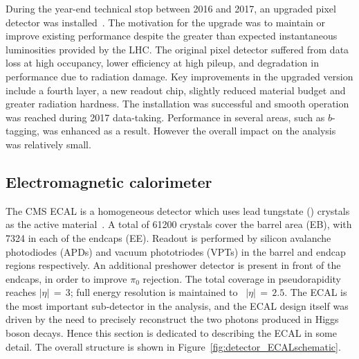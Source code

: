 During the year-end technical stop between 2016 and 2017, an upgraded pixel detector was installed~\cite{PixelUpgrade}.
The motivation for the upgrade was to maintain or improve existing performance despite the greater than expected instantaneous luminosities provided by the LHC.
The original pixel detector suffered from data loss at high occupancy, lower efficiency at high pileup, and degradation in performance due to radiation damage.
Key improvements in the upgraded version include a fourth layer, a new readout chip, slightly reduced material budget and greater radiation hardness.
The installation was successful and smooth operation was reached during 2017 data-taking.
Performance in several areas, such as $b$-tagging, was enhanced as a result.
However the overall impact on the \Hgg analysis was relatively small.

\subsection{Electromagnetic calorimeter}
\label{sec:detector_ECAL}

The CMS ECAL is a homogeneous detector which uses lead tungstate (\pbw) crystals as the active material~\cite{CMSdetector,ECALperformance}.
A total of 61200 crystals cover the barrel area (EB), with 7324 in each of the endcaps (EE).
Readout is performed by silicon avalanche photodiodes (APDs) and vacuum phototriodes (VPTs) in the barrel and endcap regions respectively.
An additional preshower detector is present in front of the endcaps, in order to improve $\pi_0$ rejection.
The total coverage in pseudorapidity reaches $|\eta|\,=\,3$; full energy resolution is maintained to ~$|\eta|\,=\,2.5$.
The ECAL is the most important sub-detector in the \Hgg analysis, 
and the ECAL design itself was driven by the need to precisely reconstruct the two photons produced in Higgs boson decays.
Hence this section is dedicated to describing the ECAL in some detail.
The overall structure is shown in Figure~\ref{fig:detector_ECALschematic}.

